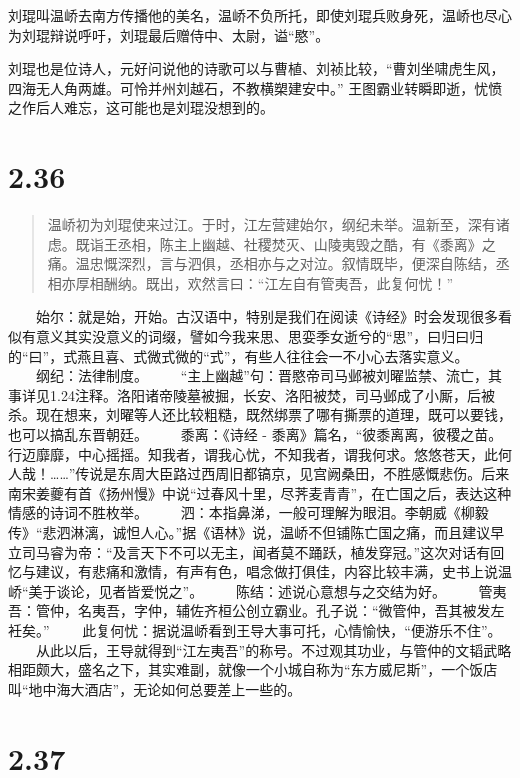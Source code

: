 \documentclass[]{book}
\begin{document}
刘琨叫温峤去南方传播他的美名，温峤不负所托，即使刘琨兵败身死，温峤也尽心为刘琨辩说呼吁，刘琨最后赠侍中、太尉，谥``愍''。

刘琨也是位诗人，元好问说他的诗歌可以与曹植、刘祯比较，``曹刘坐啸虎生风，四海无人角两雄。可怜并州刘越石，不教横槊建安中。''
王图霸业转瞬即逝，忧愤之作后人难忘，这可能也是刘琨没想到的。

\section{2.36}\label{section-82}

\begin{quote}
温峤初为刘琨使来过江。于时，江左营建始尔，纲纪未举。温新至，深有诸虑。既诣王丞相，陈主上幽越、社稷焚灭、山陵夷毁之酷，有《黍离》之痛。温忠慨深烈，言与泗俱，丞相亦与之对泣。叙情既毕，便深自陈结，丞相亦厚相酬纳。既出，欢然言曰：``江左自有管夷吾，此复何忧！''
\end{quote}

　　始尔：就是始，开始。古汉语中，特别是我们在阅读《诗经》时会发现很多看似有意义其实没意义的词缀，譬如今我来思、思娈季女逝兮的``思''，曰归曰归的``曰''，式燕且喜、式微式微的``式''，有些人往往会一不小心去落实意义。
　　纲纪：法律制度。
　　``主上幽越''句：晋愍帝司马邺被刘曜监禁、流亡，其事详见1.24注释。洛阳诸帝陵墓被掘，长安、洛阳被焚，司马邺成了小厮，后被杀。现在想来，刘曜等人还比较粗糙，既然绑票了哪有撕票的道理，既可以要钱，也可以搞乱东晋朝廷。
　　黍离：《诗经 -
黍离》篇名，``彼黍离离，彼稷之苗。行迈靡靡，中心摇摇。知我者，谓我心忧，不知我者，谓我何求。悠悠苍天，此何人哉！\ldots{}\ldots{}''传说是东周大臣路过西周旧都镐京，见宫阙桑田，不胜感慨悲伤。后来南宋姜夔有首《扬州慢》中说``过春风十里，尽荠麦青青''，在亡国之后，表达这种情感的诗词不胜枚举。
　　泗：本指鼻涕，一般可理解为眼泪。李朝威《柳毅传》``悲泗淋漓，诚怛人心。''据《语林》说，温峤不但铺陈亡国之痛，而且建议早立司马睿为帝：``及言天下不可以无主，闻者莫不踊跃，植发穿冠。''这次对话有回忆与建议，有悲痛和激情，有声有色，唱念做打俱佳，内容比较丰满，史书上说温峤``美于谈论，见者皆爱悦之''。
　　陈结：述说心意想与之交结为好。
　　管夷吾：管仲，名夷吾，字仲，辅佐齐桓公创立霸业。孔子说：``微管仲，吾其被发左衽矣。''
　　此复何忧：据说温峤看到王导大事可托，心情愉快，``便游乐不住''。
　　从此以后，王导就得到``江左夷吾''的称号。不过观其功业，与管仲的文韬武略相距颇大，盛名之下，其实难副，就像一个小城自称为``东方威尼斯''，一个饭店叫``地中海大酒店''，无论如何总要差上一些的。

\section{2.37}\label{section-83}
\end{document}
